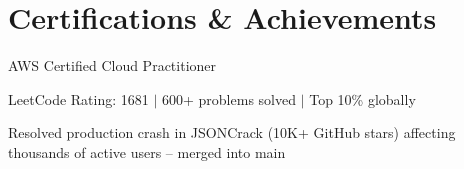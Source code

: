 \documentclass[letterpaper,10.5pt]{article}
\begin{document}
\section{Certifications \& Achievements}
\begin{itemize}[leftmargin=0.15in, label={}, itemsep=0pt]
  \small{
    \item AWS Certified Cloud Practitioner
    \item LeetCode Rating: 1681 $|$ 600+ problems solved $|$ Top 10\% globally
    \item Resolved production crash in JSONCrack (10K+ GitHub stars) affecting thousands of active users -- merged into main
  }
\end{itemize}
\end{document}
